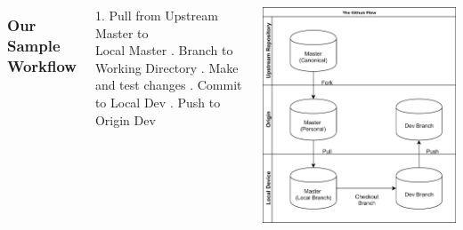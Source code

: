 \documentclass[unknownkeysallowed]{beamer}
\begin{document}
\begin{frame}
    \vspace{1cm}
	\begin{columns}
		\column{2.5in}
    \frametitle{Our Sample Workflow}
        1. Pull from Upstream Master to \\
        Local Master \linebreak{}. Branch to Working Directory \linebreak{}. Make and test changes \linebreak{}. Commit to Local Dev \linebreak{}. Push to Origin Dev \linebreak\linebreak
	\linebreak\linebreak
	\column{2.25in}
	\begin{center}
	\includegraphics[width = .9\linewidth]{assets/gitflow5}
	\end{center}
	\end{columns}
    \vspace{1cm}
\end{frame}
\end{document}
